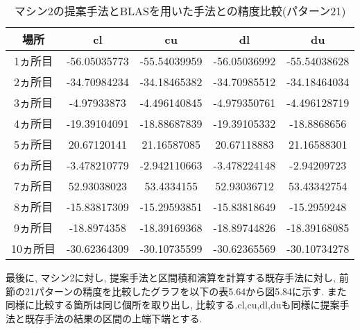 \documentclass[11pt,a4paper]{jsreport}
\theoremstyle{definition}
\begin{document}
\begin{table}[H]
\centering
\begin{tabular}{|c|c|c|c|c|}
\hline
場所 & cl & cu & dl & du \\ \hline
1ヵ所目 & -56.05035773 & -55.54039959 & -56.05036992 & -55.54038628 \\ \hline
2ヵ所目 & -34.70984234 & -34.18465382 & -34.70985512 & -34.18464034 \\ \hline
3ヵ所目 & -4.97933873 & -4.496140845 & -4.979350761 & -4.496128719 \\ \hline
4ヵ所目 & -19.39104091 & -18.88687839 & -19.39105332 & -18.8868656 \\ \hline
5ヵ所目 & 20.67120141 & 21.16587085 & 20.67118883 & 21.16588301 \\ \hline
6ヵ所目 & -3.478210779 & -2.942110663 & -3.478224148 & -2.94209723 \\ \hline
7ヵ所目 & 52.93038023 & 53.4334155 & 52.93036712 & 53.43342754 \\ \hline
8ヵ所目 & -15.83817309 & -15.29593851 & -15.83818649 & -15.2959248 \\ \hline
9ヵ所目 & -18.8974358 & -18.39169368 & -18.89744826 & -18.39168085 \\ \hline
10ヵ所目 & -30.62364309 & -30.10735599 & -30.62365569 & -30.10734278 \\ \hline
\end{tabular}
\caption{マシン2の提案手法とBLASを用いた手法との精度比較(パターン21)}
\end{table}

\indent 最後に, マシン2に対し, 提案手法と区間積和演算を計算する既存手法に対し, 前節の21パターンの精度を比較したグラフを以下の表5.64から図5.84に示す. また同様に比較する箇所は同じ個所を取り出し, 比較する.cl,cu,dl,duも同様に提案手法と既存手法の結果の区間の上端下端とする.
\end{document}
